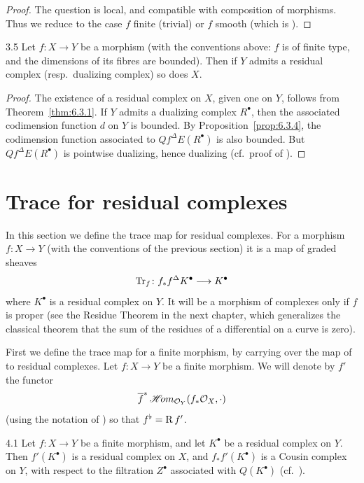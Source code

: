\begin{proof}
The question is local, and compatible with composition of morphisms. Thus we reduce to the case $f$ finite (trivial) or $f$ smooth (which is ).
\end{proof}

\begin{bookcorollary}{3.5}\label{cor:6.3.5}
Let $f\colon X\to Y$ be a morphism (with the conventions above: $f$ is of finite type, and the dimensions of its fibres are bounded). Then if $Y$ admits a residual complex (resp.\ dualizing complex) so does $X$.
\end{bookcorollary}

\begin{proof}
The existence of a residual complex on $X$, given one on $Y$, follows from Theorem~\ref{thm:6.3.1}. If $Y$ admits a dualizing complex $R^\bullet$, then the associated codimension function $d$ on $Y$ is bounded. By Proposition~\ref{prop:6.3.4}, the codimension function associated to $Qf^{\Delta}E(R^\bullet)$ is also bounded. But $Qf^{\Delta}E(R^\bullet)$ is pointwise dualizing, hence dualizing (cf.\ proof of ).
\end{proof}

\section{Trace for residual complexes}\label{sec:6.4}

In this section we define the trace map for residual complexes. For a morphism $f\colon X\to Y$ (with the conventions of the previous section) it is a map of graded sheaves
\[
\operatorname{Tr}_f\colon f_*f^{\Delta}K^\bullet \longrightarrow K^\bullet
\]
where $K^\bullet$ is a residual complex on $Y$. It will be a morphism of complexes only if $f$ is proper (see the Residue Theorem in the next chapter, which generalizes the classical theorem that the sum of the residues of a differential on a curve is zero).

First we define the trace map for a finite morphism, by carrying over the map of  to residual complexes. Let $f\colon X\to Y$ be a finite morphism. We will denote by $f'$ the functor
\[
\overline{f}^{*}\mathop{\mathscr{H}\!om}\nolimits_{\mathcal{O}_Y}(f_*\mathcal{O}_X,\cdot)
\]
(using the notation of ) so that $f^{\flat} = \operatorname{R} f'$.

\begin{booklemma}{4.1}\label{lem:6.4.1}
Let $f\colon X\to Y$ be a finite morphism, and let $K^\bullet$ be a residual complex on $Y$. Then $f'(K^\bullet)$ is a residual complex on $X$, and $f_*f'(K^\bullet)$ is a Cousin complex on $Y$, with respect to the filtration $Z^\bullet$ associated with $Q(K^\bullet)$ (cf.\ ).
\end{booklemma}

